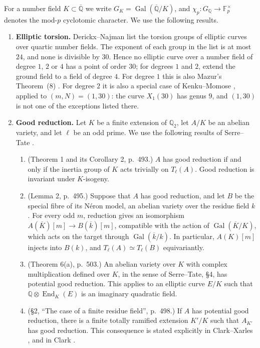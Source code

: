 \documentclass[11pt]{article}
\newcommand{\Q}{\mathbb Q}
\newcommand{\F}{\mathbb F}
\DeclareMathOperator{\End}{End}
\DeclareMathOperator{\Gal}{Gal}
\begin{document}
For a number field \(K\subset\overline{\Q}\) we write
\(G_K=\Gal(\overline{\Q}/K)\), and
\(\chi_p:G_{\Q}\to\F_p^\times\) denotes the mod-\(p\) cyclotomic
character. We use the following results.
\begin{enumerate}
\item \textbf{Elliptic torsion.} Derickx--Najman
\cite[Theorem 1.1]{DN} list the torsion groups of elliptic curves over
quartic number fields. The exponent of each group in the list is at
most \(24\), and none is divisible by \(30\). Hence no elliptic curve
over a number field of degree \(1\), \(2\) or \(4\) has a point of
order \(30\); for degrees \(1\) and \(2\), extend the ground field to
a field of degree \(4\). For degree \(1\) this is also Mazur's
Theorem~(8) \cite{Mazur}. For degree \(2\) it is also a special case
of Kenku--Momose \cite[Theorem (0.1)]{KM}, applied to
\((m,N)=(1,30)\): the curve \(X_1(30)\) has genus \(9\), and
\((1,30)\) is not one of the exceptions listed there.

\item \textbf{Good reduction.} Let \(K\) be a finite extension of
\(\Q_2\), let \(A/K\) be an abelian variety, and let \(\ell\) be an
odd prime. We use the following results of Serre--Tate \cite{ST}.
\begin{enumerate}
\item (Theorem 1 and its Corollary 2, p.~493.) \(A\) has good
reduction if and only if the inertia group of \(K\) acts trivially on
\(T_\ell(A)\). Good reduction is invariant under \(K\)-isogeny.
\item (Lemma 2, p.~495.) Suppose that \(A\) has good reduction, and let
\(B\) be the special fibre of its N\'eron model, an abelian variety
over the residue field \(k\). For every odd \(m\), reduction gives an
isomorphism \(A(\overline K)[m]\to B(\overline k)[m]\), compatible with
the action of \(\Gal(\overline K/K)\), which acts on the target
through \(\Gal(\overline k/k)\). In particular, \(A(K)[m]\) injects
into \(B(k)\), and \(T_\ell(A)\simeq T_\ell(B)\) equivariantly.
\item (Theorem 6(a), p.~503.) An abelian variety over \(K\) with
complex multiplication defined over \(K\), in the sense of
Serre--Tate, \S4, has potential good reduction. This applies to an
elliptic curve \(E/K\) such that \(\Q\otimes\End_K(E)\) is an
imaginary quadratic field.
\item (\S2, ``The case of a finite residue field'', p.~498.) If \(A\)
has potential good reduction, there is a finite totally ramified
extension \(K'/K\) such that \(A_{K'}\) has good reduction. This
consequence is stated explicitly in Clark--Xarles \cite[\S2.4]{CX},
and in Clark \cite[\S2.1]{Clark}.
\end{enumerate}


\end{enumerate}
\end{document}
